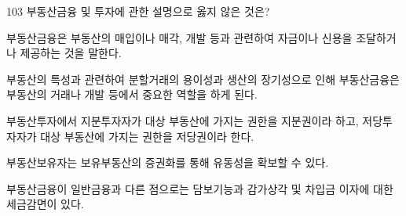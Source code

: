 \begin{question}{103}
부동산금융 및 투자에 관한 설명으로 옳지 않은 것은?
\begin{choices}
  \item 부동산금융은 부동산의 매입이나 매각, 개발 등과 관련하여 자금이나 신용을 조달하거나 제공하는 것을 말한다.
  \item 부동산의 특성과 관련하여 분할거래의 용이성과 생산의 장기성으로 인해 부동산금융은 부동산의 거래나 개발 등에서 중요한 역할을 하게 된다.
  \item 부동산투자에서 지분투자자가 대상 부동산에 가지는 권한을 지분권이라 하고, 저당투자자가 대상 부동산에 가지는 권한을 저당권이라 한다.
  \item 부동산보유자는 보유부동산의 증권화를 통해 유동성을 확보할 수 있다.
  \item 부동산금융이 일반금융과 다른 점으로는 담보기능과 감가상각 및 차입금 이자에 대한 세금감면이 있다.
\end{choices}
\end{question}
